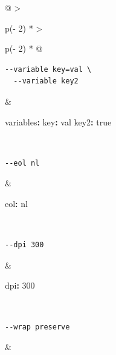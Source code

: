 \documentclass[
]{article}
\newenvironment{Shaded}{}{}
\newcommand{\AttributeTok}[1]{\textcolor[rgb]{0.49,0.56,0.16}{#1}}
\newcommand{\CharTok}[1]{\textcolor[rgb]{0.25,0.44,0.63}{#1}}
\newcommand{\DecValTok}[1]{\textcolor[rgb]{0.25,0.63,0.44}{#1}}
\newcommand{\FunctionTok}[1]{\textcolor[rgb]{0.02,0.16,0.49}{#1}}
\newcommand{\KeywordTok}[1]{\textcolor[rgb]{0.00,0.44,0.13}{\textbf{#1}}}
\begin{document}
\begin{longtable}[]{@{}
  >{\raggedright\arraybackslash}p{(\columnwidth - 2\tabcolsep) * }
  >{\raggedright\arraybackslash}p{(\columnwidth - 2\tabcolsep) * }@{}}
\begin{minipage}[t]{\linewidth}
\begin{verbatim}
--variable key=val \
  --variable key2
\end{verbatim}
\end{minipage} & \begin{minipage}[t]{\linewidth}\raggedright
\begin{Shaded}
\begin{Highlighting}[]
\FunctionTok{variables}\KeywordTok{:}
\AttributeTok{  }\FunctionTok{key}\KeywordTok{:}\AttributeTok{ val}
\AttributeTok{  }\FunctionTok{key2}\KeywordTok{:}\AttributeTok{ }\CharTok{true}
\end{Highlighting}
\end{Shaded}
\end{minipage} \\
\begin{minipage}[t]{\linewidth}\raggedright
\begin{verbatim}
--eol nl
\end{verbatim}
\end{minipage} & \begin{minipage}[t]{\linewidth}\raggedright
\begin{Shaded}
\begin{Highlighting}[]
\FunctionTok{eol}\KeywordTok{:}\AttributeTok{ nl}
\end{Highlighting}
\end{Shaded}
\end{minipage} \\
\begin{minipage}[t]{\linewidth}\raggedright
\begin{verbatim}
--dpi 300
\end{verbatim}
\end{minipage} & \begin{minipage}[t]{\linewidth}\raggedright
\begin{Shaded}
\begin{Highlighting}[]
\FunctionTok{dpi}\KeywordTok{:}\AttributeTok{ }\DecValTok{300}
\end{Highlighting}
\end{Shaded}
\end{minipage} \\
\begin{minipage}[t]{\linewidth}\raggedright
\begin{verbatim}
--wrap preserve
\end{verbatim}
\end{minipage} & \begin{minipage}[t]{\linewidth}\raggedright
\begin{Shaded}

\end{Shaded}
\end{minipage}
\end{longtable}
\end{document}
